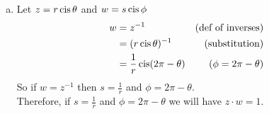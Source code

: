 \begin{enumerate}[(a)]
\item
Let $z=r\operatorname{cis}\theta$ and $w=s\operatorname{cis}\phi$
\begin{align*}
w &= z^{-1} &\text{(def of inverses)}\\
&= (r\operatorname{cis}\theta)^{-1} &\text{(substitution)}\\
&= \frac{1}{r} \operatorname{cis}(2\pi - \theta) &\text{($\phi = 2\pi - \theta$)}\\
\end{align*}
So if $w=z^{-1}$ then $s=\displaystyle\frac{1}{r}$ and $\phi=2\pi-\theta$.\\
Therefore, if $s=\displaystyle\frac{1}{r}$ and $\phi=2\pi-\theta$ we will have $z\cdot w=1$.
\end{enumerate}

